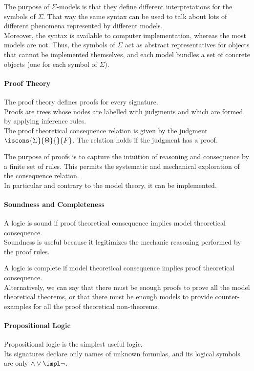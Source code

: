 The purpose of $\Sigma$-models is that they define different interpretations for the symbols of $\Sigma$.
That way the same syntax can be used to talk about lots of different phenomena represented by different models.\\
Moreover, the syntax is available to computer implementation, whereas the most models are not.
Thus, the symbols of $\Sigma$ act as abstract representatives for objects that cannot be implemented themselves, and each model bundles a set of concrete objects (one for each symbol of $\Sigma$).
\medskip

\paragraph{Proof Theory}
The proof theory defines proofs for every signature.\\
Proofs are trees whose nodes are labelled with judgments and which are formed by applying inference rules.\\
The proof theoretical consequence relation is given by the judgment $\iscons{\Sigma}{\Theta}{}{F}$.
The relation holds if the judgment has a proof.
\medskip

The purpose of proofs is to capture the intuition of reasoning and consequence by a finite set of rules.
This permits the systematic and mechanical exploration of the consequence relation.\\
In particular and contrary to the model theory, it can be implemented.

\paragraph{Soundness and Completeness}
A logic is sound if proof theoretical consequence implies model theoretical consequence.\\
Soundness is useful because it legitimizes the mechanic reasoning performed by the proof rules.
\medskip

A logic is complete if model theoretical consequence implies proof theoretical consequence.\\
Alternatively, we can say that there must be enough proofs to prove all the model theoretical theorems, or that there must be enough models to provide counter-examples for all the proof theoretical non-theorems.

\paragraph{Propositional Logic}
Propositional logic is the simplest useful logic.\\
Its signatures declare only names of unknown formulas, and its logical symbols are only $\wedge\vee\impl\neg$.
\medskip

